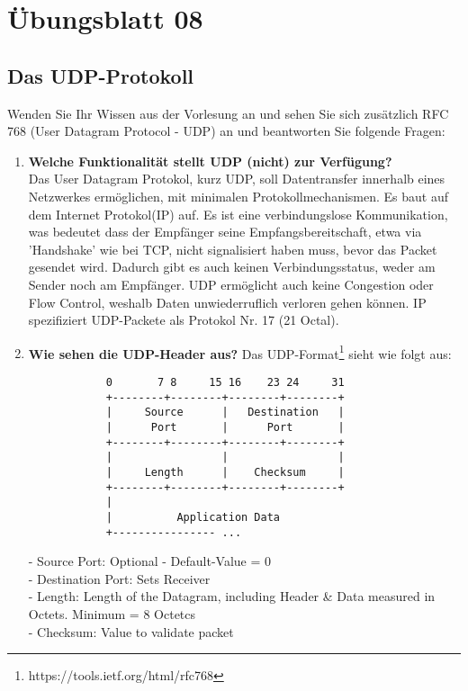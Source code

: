 \documentclass[11pt]{article}
\begin{document}
    \section{Übungsblatt 08}
    \subsection{Das UDP-Protokoll}
    Wenden Sie Ihr Wissen aus der Vorlesung an und sehen Sie sich zusätzlich RFC 768 (User Datagram
    Protocol - UDP) an und beantworten Sie folgende Fragen:
    \begin{enumerate}[label=\textbf{\alph*}.)]
        \item \textbf{Welche Funktionalität stellt UDP (nicht) zur Verfügung?}\\
        Das User Datagram Protokol, kurz UDP, soll Datentransfer innerhalb eines Netzwerkes ermöglichen, mit minimalen
        Protokollmechanismen. Es baut auf dem Internet Protokol(IP) auf.
        Es ist eine verbindungslose Kommunikation, was bedeutet dass der Empfänger seine
        Empfangsbereitschaft, etwa via 'Handshake' wie bei TCP, nicht signalisiert haben muss, bevor das Packet gesendet wird.
        Dadurch gibt es auch keinen Verbindungsstatus, weder am Sender noch am Empfänger.
        UDP ermöglicht auch keine Congestion oder Flow Control, weshalb Daten unwiederruflich verloren gehen können.
        IP spezifiziert UDP-Packete als Protokol Nr. 17 (21 Octal).


        \item \textbf{Wie sehen die UDP-Header aus?}
        Das UDP-Format\footnote[1]{https://tools.ietf.org/html/rfc768} sieht wie folgt aus:
        \begin{verbatim}
            0       7 8     15 16    23 24     31
            +--------+--------+--------+--------+
            |     Source      |   Destination   |
            |      Port       |      Port       |
            +--------+--------+--------+--------+
            |                 |                 |
            |     Length      |    Checksum     |
            +--------+--------+--------+--------+
            |
            |          Application Data
            +---------------- ...
        \end{verbatim}
        \begin{addmargin}[1em]{1em}
            - Source Port: Optional - Default-Value = 0\\
            - Destination Port: Sets Receiver\\
            - Length: Length of the Datagram, including Header \& Data measured in Octets. Minimum = 8 Octetcs\\
            - Checksum: Value to validate packet
        \end{addmargin}


\end{enumerate}
\end{document}
